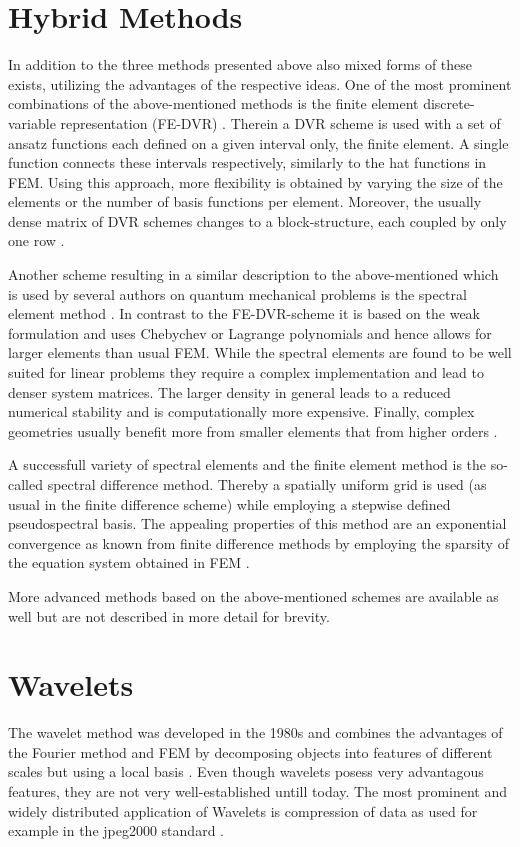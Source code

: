 \section{Hybrid Methods}
In addition to the three methods presented above also mixed forms of these exists, utilizing the advantages of the respective ideas.
One of the most prominent combinations of the above-mentioned methods is the finite element discrete-variable representation (FE-DVR) \cite{impLDVR,taoDVR}.
Therein a DVR scheme is used with a set of ansatz functions each defined on a given interval only, the finite element.
A single function connects these intervals respectively, similarly to the hat functions in FEM.
Using this approach, more flexibility is obtained by varying the size of the elements or the number of basis functions per element.
Moreover, the usually dense matrix of DVR schemes changes to a block-structure, each coupled by only one row \cite{taoDVR}.

Another scheme resulting in a similar description to the above-mentioned which is used by several authors on quantum mechanical problems is the spectral element method \cite{sem1}.
In contrast to the FE-DVR-scheme it is based on the weak formulation and uses Chebychev or Lagrange polynomials and hence allows for larger elements than usual FEM.
While the spectral elements are found to be well suited for linear problems they require a complex implementation and lead to denser system matrices.
The larger density in general leads to a reduced numerical stability and is computationally more expensive.
Finally, complex geometries usually benefit more from smaller elements that from higher orders \cite{hf_dreyer}.

A successfull variety of spectral elements and the finite element method is the so-called spectral difference method.
Thereby a spatially uniform grid is used (as usual in the finite difference scheme) while employing a stepwise defined pseudospectral basis.
The appealing properties of this method are an exponential convergence as known from finite difference methods by employing the sparsity of the equation system obtained in FEM \cite{SpectDiff}.

More advanced methods based on the above-mentioned schemes are available as well \cite{sd_mult,sd_unstructured} but are not described in more detail for brevity.

\section{Wavelets}
\label{ch:wavelet}
The wavelet method was developed in the 1980s \cite{waveletLA} and combines the advantages of the Fourier method and FEM by decomposing objects into features of different scales but using a local basis \cite{waveletLA, dahlke, FdFeWavelet}.
Even though wavelets posess very advantagous features, they are not very well-established untill today.
The most prominent and widely distributed application of Wavelets is compression of data as used for example in the jpeg2000 standard \cite{iso15444}.

